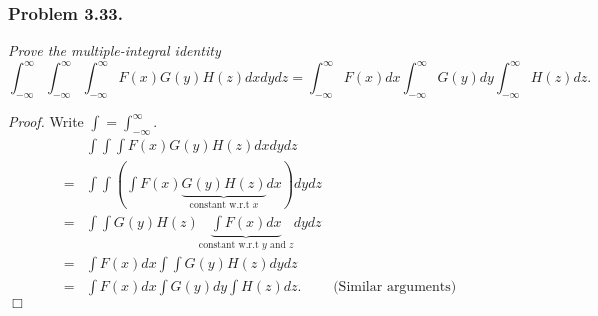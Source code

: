 \documentclass{article}
\begin{document}



\subsubsection*{Problem 3.33.}
\emph{Prove the multiple-integral identity
\[
  \int_{-\infty}^{\infty}\int_{-\infty}^{\infty}\int_{-\infty}^{\infty}
    F(x)G(y)H(z)dx dy dz
  = \int_{-\infty}^{\infty} F(x) dx
    \int_{-\infty}^{\infty} G(y) dy
    \int_{-\infty}^{\infty} H(z) dz.
\]}

\emph{Proof.}
Write $\int = \int_{-\infty}^{\infty}$.
\begin{align*}
  &\int\int\int
    F(x)G(y)H(z)dx dy dz \\
  =&
  \int\int \left( \int F(x)\underbrace{G(y)H(z)}_{\text{constant w.r.t $x$}}dx \right) dy dz \\
  =&
  \int\int G(y)H(z) \underbrace{\int F(x)dx}_{\text{constant w.r.t $y$ and $z$}} dy dz \\
  =&
  \int F(x)dx \int\int G(y)H(z) dy dz \\
  =& \int F(x) dx\int G(y) dy\int H(z) dz.
    &\text{(Similar arguments)}
\end{align*}
$\Box$ \\\\



\end{document}
